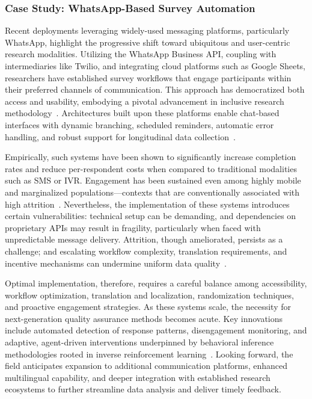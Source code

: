 \documentclass[sigconf]{acmart}
\begin{document}
\subsubsection{Case Study: WhatsApp-Based Survey Automation}

Recent deployments leveraging widely-used messaging platforms, particularly WhatsApp, highlight the progressive shift toward ubiquitous and user-centric research modalities. Utilizing the WhatsApp Business API, coupling with intermediaries like Twilio, and integrating cloud platforms such as Google Sheets, researchers have established survey workflows that engage participants within their preferred channels of communication. This approach has democratized both access and usability, embodying a pivotal advancement in inclusive research methodology~\cite{ref117}. Architectures built upon these platforms enable chat-based interfaces with dynamic branching, scheduled reminders, automatic error handling, and robust support for longitudinal data collection~\cite{ref117}.

Empirically, such systems have been shown to significantly increase completion rates and reduce per-respondent costs when compared to traditional modalities such as SMS or IVR. Engagement has been sustained even among highly mobile and marginalized populations—contexts that are conventionally associated with high attrition~\cite{ref117}. Nevertheless, the implementation of these systems introduces certain vulnerabilities: technical setup can be demanding, and dependencies on proprietary APIs may result in fragility, particularly when faced with unpredictable message delivery. Attrition, though ameliorated, persists as a challenge; and escalating workflow complexity, translation requirements, and incentive mechanisms can undermine uniform data quality~\cite{ref117}.

Optimal implementation, therefore, requires a careful balance among accessibility, workflow optimization, translation and localization, randomization techniques, and proactive engagement strategies. As these systems scale, the necessity for next-generation quality assurance methods becomes acute. Key innovations include automated detection of response patterns, disengagement monitoring, and adaptive, agent-driven interventions underpinned by behavioral inference methodologies rooted in inverse reinforcement learning~\cite{ref18}. Looking forward, the field anticipates expansion to additional communication platforms, enhanced multilingual capability, and deeper integration with established research ecosystems to further streamline data analysis and deliver timely feedback.
\end{document}
